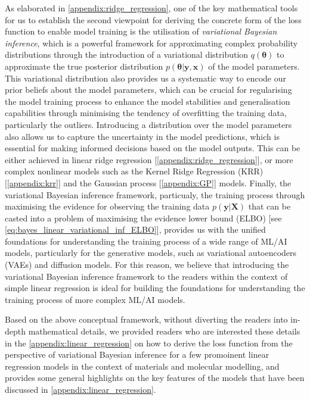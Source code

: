 As elaborated in \cref{appendix:ridge_regression}, one of the key mathematical tools for us to establish the second viewpoint for deriving the concrete form of the loss function to enable model training is the utilisation of \emph{variational Bayesian inference}, which is a powerful framework for approximating complex probability distributions through the introduction of a variational distribution $q(\boldsymbol{\theta})$ to approximate the true posterior distribution $p(\boldsymbol{\theta}|\bm{y},\bm{x})$ of the model parameters. This variational distribution also provides us a systematic way to encode our prior beliefs about the model parameters, which can be crucial for regularising the model training process to enhance the model stabilities and generalisation capabilities through minimising the tendency of overfitting the training data, particularly the outliers. Introducing a distribution over the model parameters also allows us to capture the uncertainty in the model predictions, which is essential for making informed decisions based on the model outputs. This can be either achieved in linear ridge regression [\cref{appendix:ridge_regression}], or more complex nonlinear models such as the Kernel Ridge Regression (KRR) [\cref{appendix:krr}] and the Gaussian process  [\cref{appendix:GP}] models. Finally, the variational Bayesian inference framework, particualy, the training process through maximising the evidence for observing the training data $p(\bm{y}|\bm{X})$ that can be casted into a problem of maximising the evidence lower bound (ELBO) [see \cref{eq:bayes_linear_variational_inf_ELBO}], provides us with the unified foundations for understanding the training process of a wide range of ML/AI models,\cite{prince2023understanding} particularly for the generative models, such as variational autoencoders (VAEs)\cite{diederik2019introduction} and diffusion models.\cite{sohl2015deep,song2019generative} For this reason, we believe that introducing the variational Bayesian inference framework to the readers within the context of simple linear regression is ideal for building the foundations for understanding the training process of more complex ML/AI models.

Based on the above conceptual framework, without diverting the readers into in-depth mathematical details, we provided readers who are interested these details in the \cref{appendix:linear_regression} on how to derive the loss function from the perspective of variational Bayesian inference for a few promoinent linear regression models in the context of materials and molecular modelling, and provides some general highlights on the key features of the models that have been discussed in \cref{appendix:linear_regression}. 

